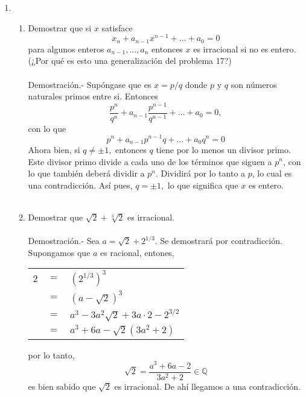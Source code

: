 \begin{enumerate}
      \item
	 \begin{enumerate}[\bfseries (a)]
	    \item Demostrar que si $x$ satisface
	       $$x_n + a_{n-1}x^{n-1} + ... + a_0 = 0$$
	       para algunos enteros $a_{n-1},...,a_n$ entonces $x$ es irracional si no es entero. (¿Por qué es esto una generalización del problema 17?)\\\\
	       Demostración.- \; Supóngase que es $x=p/q$ donde $p$ y $q$ son números naturales primos entre si. Entonces $$\dfrac{p^n}{q^n} + a_{n-1} \dfrac{p^{n-1}}{q^{n-1}} + ... + a_0 = 0,$$
	       con lo que 
	       $$p^n + a_{n-1} p ^{n-1}q + ... + a_0 q^n = 0$$
	       Ahora bien, si $q \neq \pm 1,$ entonces $q$ tiene por lo menos un divisor primo. Este divisor primo divide a cada uno de los términos que siguen a $p^n$, con lo que también deberá dividir a $p^n$. Dividirá por lo tanto a $p$, lo cual es una contradicción. Así pues, $q= \pm 1,$ lo que significa que $x$ es entero.\\\\
	    \item Demostrar que $\sqrt{2} + \sqrt[3]{2}$ es irracional.\\\\ 
	       Demostración.- \; Sea $a=\sqrt{2} + 2^{1/3}$. Se demostrará por contradicción. Supongamos que $a$ es racional, entones,
	       \begin{center}
		  \begin{tabular}{crl}
		     $2$ & $=$ & $(2^{1/3})^3$ \\
			 & $=$ & $(a- \sqrt{2})^3$ \\
			 & $=$ & $a^3 - 3a^2 \sqrt{2} + 3a \cdot 2 - 2^{3/2}$ \\
			 & $=$ & $a^3 + 6a - \sqrt{2}(3a^2+2)$ \\
		  \end{tabular}
	       \end{center}
	       por lo tanto, $$\sqrt{2}=\dfrac{a^3 + 6a -2}{3a^2 + 2} \in \mathbb{Q}$$
	       es bien sabido que $\sqrt{2}$ es irracional. De ahí llegamos a una contradicción.\\\\
      \end{enumerate}


\end{enumerate}
